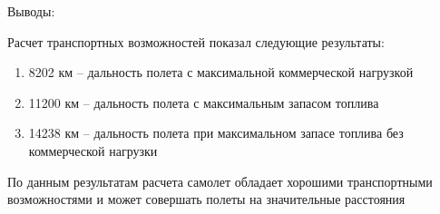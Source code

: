 \begin{center}
    Выводы:
\end{center}

Расчет транспортных возможностей показал следующие результаты:
\begin{enumerate}
    \item 8202 км -- дальность полета с максимальной коммерческой нагрузкой
    \item 11200 км -- дальность полета с максимальным запасом топлива
    \item 14238 км -- дальность полета при максимальном запасе топлива без
коммерческой нагрузки
\end{enumerate}

По данным результатам расчета самолет обладает хорошими транспортными
возможностями и может совершать полеты на значительные расстояния 

